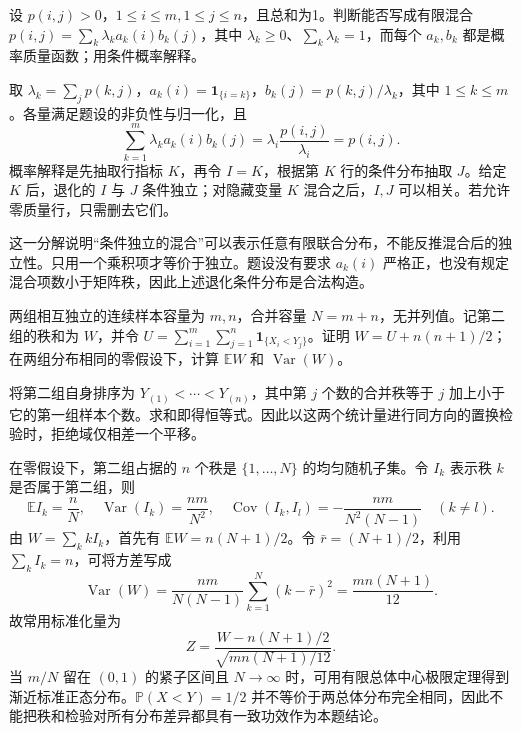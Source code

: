 \documentclass[UTF8,12pt,a4paper,fontset=fandol]{ctexbook}
\newcommand{\E}{\mathbb E}
\newcommand{\PP}{\mathbb P}
\DeclareMathOperator{\Var}{Var}
\DeclareMathOperator{\Cov}{Cov}
\begin{document}
\begin{example}[原题3：联合分布的乘积分布混合]\label{yau:2012-3}
设 $p(i,j)>0$，$1\le i\le m,1\le j\le n$，且总和为1。判断能否写成有限混合 $p(i,j)=\sum_k\lambda_k a_k(i)b_k(j)$，其中 $\lambda_k\ge0$、$\sum_k\lambda_k=1$，而每个 $a_k,b_k$ 都是概率质量函数；用条件概率解释。
\end{example}
\begin{solve}
取 $\lambda_k=\sum_jp(k,j)$，$a_k(i)=\mathbf1_{\{i=k\}}$，$b_k(j)=p(k,j)/\lambda_k$，其中 $1\le k\le m$。各量满足题设的非负性与归一化，且
\[
\sum_{k=1}^m\lambda_k a_k(i)b_k(j)=\lambda_i\frac{p(i,j)}{\lambda_i}=p(i,j).
\]
概率解释是先抽取行指标 $K$，再令 $I=K$，根据第 $K$ 行的条件分布抽取 $J$。给定 $K$ 后，退化的 $I$ 与 $J$ 条件独立；对隐藏变量 $K$ 混合之后，$I,J$ 可以相关。若允许零质量行，只需删去它们。

这一分解说明“条件独立的混合”可以表示任意有限联合分布，不能反推混合后的独立性。只用一个乘积项才等价于独立。题设没有要求 $a_k(i)$ 严格正，也没有规定混合项数小于矩阵秩，因此上述退化条件分布是合法构造。
\end{solve}

\begin{example}[原题4：秩和统计量的均值与方差]\label{yau:2012-4}
两组相互独立的连续样本容量为 $m,n$，合并容量 $N=m+n$，无并列值。记第二组的秩和为 $W$，并令 $U=\sum_{i=1}^m\sum_{j=1}^n\mathbf1_{\{X_i<Y_j\}}$。证明 $W=U+n(n+1)/2$；在两组分布相同的零假设下，计算 $\E W$ 和 $\Var(W)$。
\end{example}
\begin{solve}
将第二组自身排序为 $Y_{(1)}<\cdots<Y_{(n)}$，其中第 $j$ 个数的合并秩等于 $j$ 加上小于它的第一组样本个数。求和即得恒等式。因此以这两个统计量进行同方向的置换检验时，拒绝域仅相差一个平移。

在零假设下，第二组占据的 $n$ 个秩是 $\{1,\ldots,N\}$ 的均匀随机子集。令 $I_k$ 表示秩 $k$ 是否属于第二组，则
\[
\E I_k=\frac nN,\quad \Var(I_k)=\frac{nm}{N^2},\quad \Cov(I_k,I_l)=-\frac{nm}{N^2(N-1)}\quad(k\ne l).
\]
由 $W=\sum_k kI_k$，首先有 $\E W=n(N+1)/2$。令 $\bar r=(N+1)/2$，利用 $\sum_k I_k=n$，可将方差写成
\[
\Var(W)=\frac{nm}{N(N-1)}\sum_{k=1}^N(k-\bar r)^2=\frac{mn(N+1)}{12}.
\]
故常用标准化量为
\[
Z=\frac{W-n(N+1)/2}{\sqrt{mn(N+1)/12}}.
\]
当 $m/N$ 留在 $(0,1)$ 的紧子区间且 $N\to\infty$ 时，可用有限总体中心极限定理得到渐近标准正态分布。$\PP(X<Y)=1/2$ 并不等价于两总体分布完全相同，因此不能把秩和检验对所有分布差异都具有一致功效作为本题结论。
\end{solve}
\end{document}
